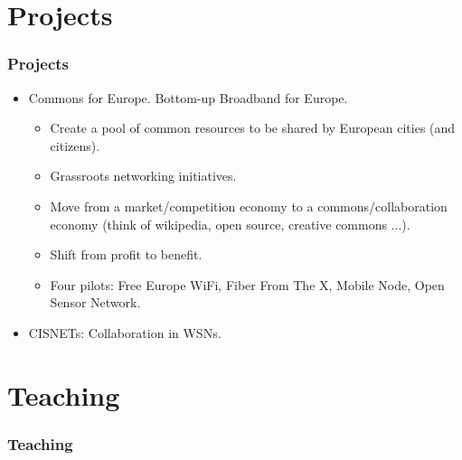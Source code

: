 \documentclass{beamer}
\begin{document}
\section{Projects}
\begin{frame}
  \frametitle{Projects}
      \begin{block}{}
        \begin{itemize}
          \item Commons for Europe. Bottom-up Broadband for Europe.          \begin{itemize}
              \item Create a pool of common resources to be shared by European cities (and citizens).
              \item Grassroots networking initiatives.
              \item Move from a market/competition economy to a commons/collaboration economy (think of wikipedia, open source, creative commons ...).
              \item Shift from profit to benefit.
              \item Four pilots: Free Europe WiFi, Fiber From The X, Mobile Node, Open Sensor Network.
          \end{itemize}
          \item CISNETs: Collaboration in WSNs.
        \end{itemize}
      \end{block}
\end{frame}

\section{Teaching}
\begin{frame}
  \frametitle{Teaching}
\end{frame}
\end{document}

